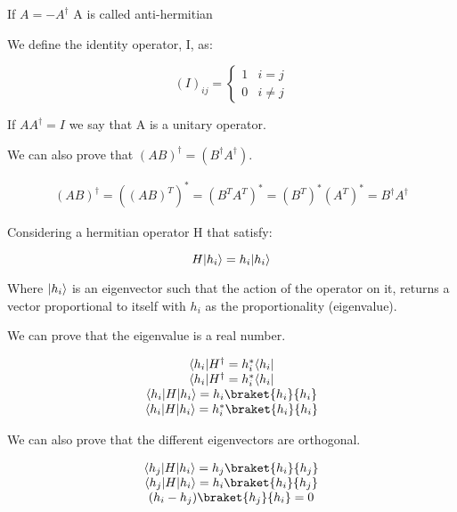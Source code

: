 If $A=-A^{\dagger}$ A is called anti-hermitian

We define the identity operator, I, as:

\begin{equation}
  (I)_{ij} = \left\{
  \begin{array}{lc}
    1 & i=j
    \\
    0 & i \neq j
  \end{array}
  \right.
\end{equation}

If $A A^{\dagger} = I$ we say that A is a unitary operator.

We can also prove that $(AB)^{\dagger} = (B^{\dagger}A^{\dagger})$.

\begin{equation}
  \begin{array}{c}
    (AB)^{\dagger} = ((AB)^T)^* = (B^TA^T)^*= (B^T)^*(A^T)^* = B^\dagger A^\dagger
  \end{array}
\end{equation}

Considering a hermitian operator H that satisfy:

\begin{equation}
  H\lvert h_i\rangle = h_i \lvert h_i\rangle
\end{equation}

Where $\lvert h_i\rangle$ is an eigenvector such that the action of the operator on it, returns a vector proportional to itself with $h_i$ as the proportionality (eigenvalue).

We can prove that the eigenvalue is a real number.

\begin{equation}
  \begin{array}{c}
    \bra{h_i}H^{\dagger} = h_i^* \bra{h_i}
    \\
    \bra{h_i}H^{\dagger} = h_i^* \bra{h_i}
    \\
    \bra{h_i}H\ket{h_i} = h_i \braket{h_i}{h_i}
    \\
    \bra{h_i}H\ket{h_i} = h_i^* \braket{h_i}{h_i}
  \end{array}
\end{equation}

We can also prove that the different eigenvectors are orthogonal.

\begin{equation}
  \begin{array}{c}
    \label{6.29}
    \bra{h_j}H\ket{h_i} = h_j \braket{h_i}{h_j}
    \\
    \bra{h_j}H\ket{h_i} = h_i \braket{h_i}{h_j}
    \\
    (h_i-h_j)\braket{h_j}{h_i} = 0
  \end{array}
\end{equation}

